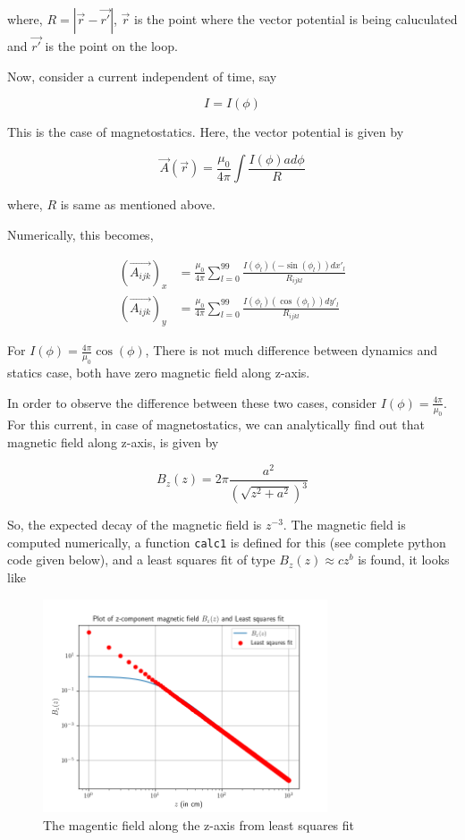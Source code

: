 \documentclass[12pt, a4paper]{article}
\begin{document}
where, $R = |\vec{r} - \vec{r'}|$, $\vec{r}$ is the point where the vector potential is being caluculated and $\vec{r'}$ is the point on the loop.

Now, consider a current independent of time, say

\begin{equation*}
I = I(\phi)
\end{equation*}

This is the case of magnetostatics. Here, the vector potential is given by

\begin{equation*}
\vec{A}(\vec{r}) = \frac{\mu_0}{4\pi} \int \frac{I(\phi)ad\phi}{R}
\end{equation*}

where, $R$ is same as mentioned above.

Numerically, this becomes,

\begin{align*}
\left( \vec{A_{ijk}} \right)_x &= \frac{\mu_0}{4\pi} \sum_{l = 0}^{99} \frac{I(\phi_l)(-\sin(\phi_l))dx'_l}{R_{ijkl}} \\
\left( \vec{A_{ijk}} \right)_y &= \frac{\mu_0}{4\pi} \sum_{l = 0}^{99} \frac{I(\phi_l)(\cos(\phi_l))dy'_l}{R_{ijkl}}
\end{align*}

For $I(\phi) = \frac{4\pi}{\mu_0} \cos(\phi)$, There is not much difference between dynamics and statics case, both have zero magnetic field along z-axis. 

In order to observe the difference between these two cases, consider $I(\phi) = \frac{4\pi}{\mu_0}$. For this current, in case of magnetostatics, we can analytically find out that magnetic field along z-axis, is given by

\begin{equation*}
B_z(z) = 2\pi \frac{a^2}{(\sqrt{z^2 + a^2})^3}
\end{equation*}

So, the expected decay of the magnetic field is $z^{-3}$. The magnetic field is computed numerically, a function \texttt{calc1} is defined for this (see complete python code given below), and a least squares fit of type $B_z(z) \approx cz^b$ is found, it looks like

\begin{figure}[H]
\centering
\includegraphics[width=0.75\textwidth]{Bzconstfit.png}
\caption{The magentic field along the z-axis from least squares fit}
\end{figure}
\end{document}
